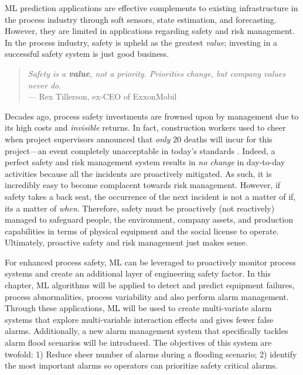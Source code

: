 %
% 

ML prediction applications are effective complements to existing infrastructure in the process industry through soft sensors, state estimation, and forecasting. However, they are limited in applications regarding safety and risk management.  In the process industry, safety is upheld as the greatest \textit{value}; investing in a successful safety system is just good business.  

\begin{quote}
    \textit{Safety is a \textbf{value}, not a priority.  Priorities change, but company values never do.} \\
    --- Rex Tillerson, ex-CEO of ExxonMobil
\end{quote}

Decades ago, process safety investments are frowned upon by management due to its high costs and \textit{invisible} returns. In fact, construction workers used to cheer when project supervisors announced that \textit{only} 20 deaths will incur for this project---an event completely unacceptable in today's standards \cite{esrm}. Indeed, a perfect safety and risk management system results in \textit{no change} in day-to-day activities because all the incidents are proactively mitigated. As such, it is incredibly easy to become complacent towards risk management. However, if safety takes a back seat, the occurrence of the next incident is not a matter of if, its a matter of \textit{when}. Therefore, safety must be proactively (not reactively) managed to safeguard people, the environment, company assets, and production capabilities in terms of physical equipment and the social license to operate. Ultimately, proactive safety and risk management just makes sense.  

For enhanced process safety, ML can be leveraged to proactively monitor process systems and create an additional layer of engineering safety factor. In this chapter, ML algorithms will be applied to detect and predict equipment failures, process abnormalities, process variability and also perform alarm management. Through these applications, ML will be used to create multi-variate alarm systems that explore multi-variable interaction effects and gives fewer false alarms. Additionally, a new alarm management system that specifically tackles alarm flood scenarios will be introduced.  The objectives of this system are twofold: 1) Reduce sheer number of alarms during a flooding scenario; 2) identify the most important alarms so operators can prioritize safety critical alarms.

